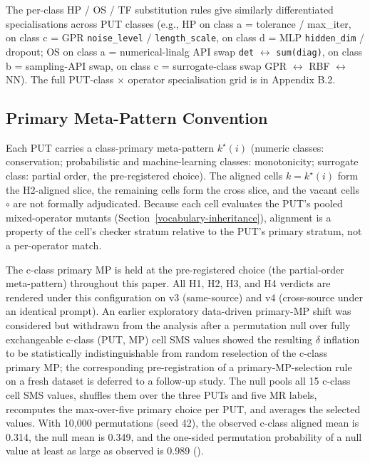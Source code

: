 \documentclass[review,12pt,authoryear]{elsarticle}
\begin{document}
The per-class HP / OS / TF substitution rules give similarly
differentiated specialisations across PUT classes (e.g., HP on class a =
tolerance / max\_iter, on class c = GPR \texttt{noise\_level} /
\texttt{length\_scale}, on class d = MLP \texttt{hidden\_dim} / dropout;
OS on class a = numerical-linalg API swap \texttt{det} $\leftrightarrow$
\texttt{sum(diag)}, on class b = sampling-API swap, on class c =
surrogate-class swap GPR $\leftrightarrow$ RBF $\leftrightarrow$ NN). The full PUT-class $\times$ operator
specialisation grid is in Appendix B.2.

\subsection{Primary Meta-Pattern Convention}\label{primary-mp-convention}

Each PUT carries a class-primary meta-pattern $k^\star(i)$ (numeric
classes: conservation; probabilistic and machine-learning classes:
monotonicity; surrogate class: partial order, the pre-registered
choice). The aligned cells $k = k^\star(i)$ form the H2-aligned slice,
the remaining cells form the cross slice, and the vacant cells
\texttt{$\circ$} are not formally adjudicated. Because each cell
evaluates the PUT's pooled mixed-operator mutants
(Section~\ref{vocabulary-inheritance}), alignment is a property of the
cell's checker stratum relative to the PUT's primary stratum, not a
per-operator match.

The c-class primary MP is held at the pre-registered choice (the
partial-order meta-pattern)
throughout this paper. All H1, H2, H3, and H4 verdicts are rendered
under this configuration on v3 (same-source) and v4 (cross-source under
an identical prompt). An earlier exploratory data-driven primary-MP
shift was considered but withdrawn from the analysis after a permutation
null over fully exchangeable c-class (PUT, MP) cell SMS values showed
the resulting $\delta$ inflation to be statistically indistinguishable from
random reselection of the c-class primary MP; the corresponding
pre-registration of a primary-MP-selection rule on a fresh dataset is
deferred to a follow-up study. The null pools all 15 c-class cell SMS
values, shuffles them over the three PUTs and five MR labels, recomputes
the max-over-five primary choice per PUT, and averages the selected
values. With 10,000 permutations (seed 42), the observed c-class aligned
mean is 0.314, the null mean is 0.349, and the one-sided permutation
probability of a null value at least as large as observed is 0.989
().
\end{document}
